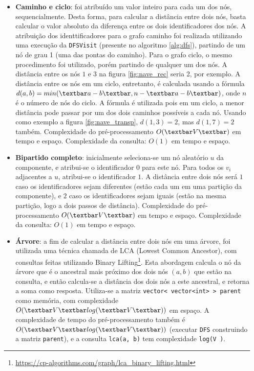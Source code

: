 \begin{itemize}
	\item \textbf{Caminho e ciclo}: foi atribuído um valor inteiro para cada um dos nós, sequencialmente. Desta forma, para calcular a distância entre dois nós, basta calcular o valor absoluto da diferença entre os dois identificadores dos nós. A atribuição dos identtificadores para o grafo caminho foi realizada utilizando uma execução da \texttt{DFSVisit} (presente no algoritmo \ref{alg:dfs}), partindo de um nó de grau 1 (uma das pontas do caminho). Para o grafo ciclo, o mesmo procedimento foi utilizado, porém partindo de qualquer um dos nós. A distância entre os nós $1$ e $3$ na figura \ref{fig:nave_rec} seria 2, por exemplo. A distância entre os nós em um ciclo, entretanto, é calculada usando a fórmula $d(a, b) = min(\textbar a - b \textbar, n - \textbar a - b \textbar) $, onde $n$ é o número de nós do ciclo. A fórmula é utilizada pois em um ciclo, a menor distância pode passar por um dos dois caminhos possíveis a cada nó. Usando como exemplo a figura \ref{fig:nave_transp}, $d(1, 3) = 2$, mas $d(1,7) = 2$ também. Complexidade do pré-processamento $O(\textbar V \textbar)$ em tempo e espaço. Complexidade da consulta: $O(1)$ em tempo e espaço.
	\item \textbf{Bipartido completo}: inicialmente seleciona-se um nó aleatório $u$ da componente, e atribui-se o identificador $0$ para este nó. Para todos os $v_i$ adjacentes a $u$, atribui-se o identificador $1$. A distância entre dois nós será $1$ caso os identificadores sejam diferentes (estão cada um em uma partição da componente), e $2$ caso os identificadores sejam iguais (estão na mesma partição, logo a dois passos de distância). Complexidade do pré-processamento $O(\textbar V \textbar)$ em tempo e espaço. Complexidade da consulta: $O(1)$ em tempo e espaço.
	\item \textbf{Árvore}: a fim de calcular a distância entre dois nós em uma árvore, foi utilizada uma técnica chamada de LCA (Lowest Common Ancestor), com consultas feitas utilizando Binary Lifting\footnote{\url{https://cp-algorithms.com/graph/lca_binary_lifting.html}}. Esta abordagem calcula o nó da árvore que é o ancestral mais próximo dos dois nós $(a, b)$ que estão na consulta, e então calcula-se a distância dos dois nós a este ancestral, e retorna a soma como resposta. Utiliza-se a matriz  \texttt{vector< vector<int> > parent} como memória, com complexidade $O(\textbar V \textbar log(\textbar V \textbar ))$ em espaço. A complexidade de tempo do pré-processamento também é $O(\textbar V \textbar log(\textbar V \textbar ))$ (executar \texttt{DFS} construindo a matriz \texttt{parent}), e a consulta \texttt{lca(a, b)} tem complexidade \texttt{log(\textbar V \textbar)}.
\end{itemize}

